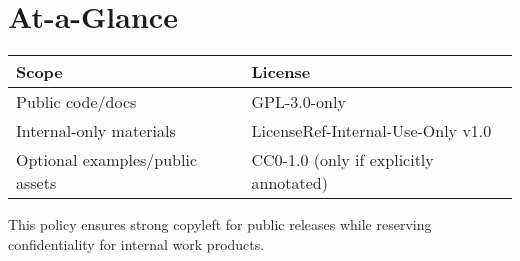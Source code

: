 \documentclass[11pt]{article}
\begin{document}
\section*{At-a-Glance}
\begin{center}
\begin{tabular}{ll}
Scope & License \\
\hline
Public code/docs & GPL-3.0-only \\
Internal-only materials & LicenseRef-Internal-Use-Only v1.0 \\
Optional examples/public assets & CC0-1.0 (only if explicitly annotated) \\
\end{tabular}
\end{center}

\bigskip
\noindent This policy ensures strong copyleft for public releases while reserving confidentiality for internal work products.
\end{document}
